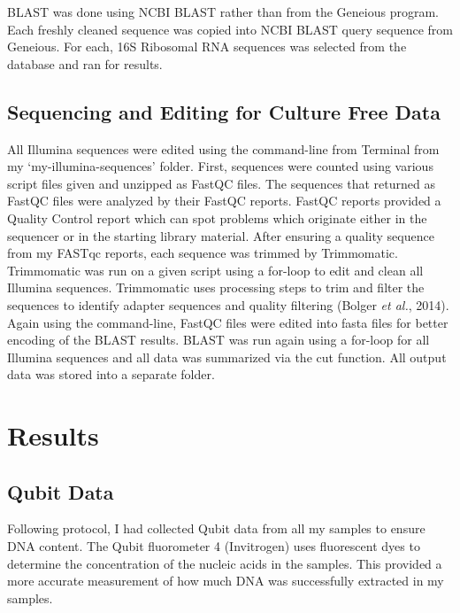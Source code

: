 \documentclass[]{article}
\begin{document}
BLAST was done using NCBI BLAST rather than from the Geneious program.
Each freshly cleaned sequence was copied into NCBI BLAST query sequence
from Geneious. For each, 16S Ribosomal RNA sequences was selected from
the database and ran for results.

\hypertarget{sequencing-and-editing-for-culture-free-data}{%
\subsection{Sequencing and Editing for Culture Free
Data}\label{sequencing-and-editing-for-culture-free-data}}

All Illumina sequences were edited using the command-line from Terminal
from my `my-illumina-sequences' folder. First, sequences were counted
using various script files given and unzipped as FastQC files. The
sequences that returned as FastQC files were analyzed by their FastQC
reports. FastQC reports provided a Quality Control report which can spot
problems which originate either in the sequencer or in the starting
library material. After ensuring a quality sequence from my FASTqc
reports, each sequence was trimmed by Trimmomatic. Trimmomatic was run
on a given script using a for-loop to edit and clean all Illumina
sequences. Trimmomatic uses processing steps to trim and filter the
sequences to identify adapter sequences and quality filtering (Bolger
\emph{et al.}, 2014). Again using the command-line, FastQC files were
edited into fasta files for better encoding of the BLAST results. BLAST
was run again using a for-loop for all Illumina sequences and all data
was summarized via the cut function. All output data was stored into a
separate folder.

\hypertarget{results}{%
\section{Results}\label{results}}

\hypertarget{qubit-data}{%
\subsection{Qubit Data}\label{qubit-data}}

Following protocol, I had collected Qubit data from all my samples to
ensure DNA content. The Qubit fluorometer 4 (Invitrogen) uses
fluorescent dyes to determine the concentration of the nucleic acids in
the samples. This provided a more accurate measurement of how much DNA
was successfully extracted in my samples.
\end{document}
